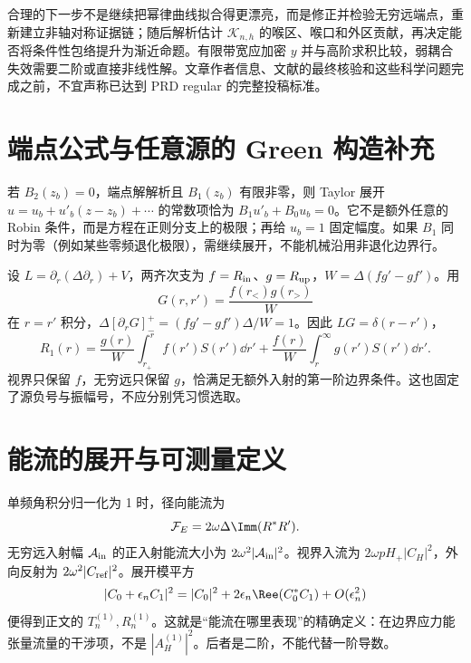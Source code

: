合理的下一步不是继续把幂律曲线拟合得更漂亮，而是修正并检验无穷远端点，重新建立非轴对称证据链；随后解析估计 $\mathcal K_{n,h}$ 的喉区、喉口和外区贡献，再决定能否将条件性包络提升为渐近命题。有限带宽应加密 $y$ 并与高阶求积比较，弱耦合失效需要二阶或直接非线性解。文章作者信息、文献的最终核验和这些科学问题完成之前，不宜声称已达到 PRD regular 的完整投稿标准。


\clearpage
\appendix
\section{端点公式与任意源的 Green 构造补充}
若 $B_2(z_b)=0$，端点解解析且 $B_1(z_b)$ 有限非零，则 Taylor 展开 $u=u_b+u'_b(z-z_b)+\cdots$ 的常数项恰为 $B_1u'_b+B_0u_b=0$。它不是额外任意的 Robin 条件，而是方程在正则分支上的极限；再给 $u_b=1$ 固定幅度。如果 $B_1$ 同时为零（例如某些零频退化极限），需继续展开，不能机械沿用非退化边界行。

设 $L=\partial_r(\Delta\partial_r)+V$，两齐次支为 $f=R_{\rm in}$、$g=R_{\rm up}$，$W=\Delta(fg'-gf')$。用
\begin{equation}
 G(r,r')=\frac{f(r_<)g(r_>)}{W}
\end{equation}
在 $r=r'$ 积分，$\Delta[\partial_rG]_-^+=(fg'-gf')\Delta/W=1$。因此 $LG=\delta(r-r')$，
\begin{equation}
 R_1(r)=\frac{g(r)}W\int_{r_+}^{r}f(r')S(r')\dd r'
 +\frac{f(r)}W\int_r^\infty g(r')S(r')\dd r'.
\end{equation}
视界只保留 $f$，无穷远只保留 $g$，恰满足无额外入射的第一阶边界条件。这也固定了源负号与振幅号，不应分别凭习惯选取。

\section{能流的展开与可测量定义}
单频角积分归一化为 1 时，径向能流为
\begin{equation}
 \mathcal F_E=2\omega\Delta\Imm(R^*R').
\end{equation}
无穷远入射幅 $\mathcal A_{\rm in}$ 的正入射能流大小为 $2\omega^2|\mathcal A_{\rm in}|^2$。视界入流为 $2\omega pH_+|C_H|^2$，外向反射为 $2\omega^2|C_{\rm ref}|^2$。展开模平方
\begin{equation}
 |C_0+\epsilon_n C_1|^2=|C_0|^2+
 2\epsilon_n\Ree(C_0^*C_1)+O(\epsilon_n^2)
\end{equation}
便得到正文的 $T_n^{(1)},R_n^{(1)}$。这就是“能流在哪里表现”的精确定义：在边界应力能张量流量的干涉项，不是 $|A_H^{(1)}|^2$。后者是二阶，不能代替一阶导数。

